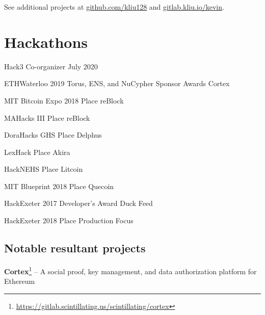 \documentclass[paper=letter]{tccv}
\begin{document}
See additional projects at \href{https://github.com/kliu128}{github.com/kliu128}
and \href{https://gitlab.kliu.io/kevin}{gitlab.kliu.io/kevin}.
    

\section{Hackathons}

\begin{yearlist}
    \item{Hack3}
         {Co-organizer} {July 2020}

    \item{ETHWaterloo 2019}
        {Torus, ENS, and NuCypher Sponsor Awards} {Cortex}

    \item{MIT Bitcoin Expo 2018}
        { Place} {reBlock}

    \item{MAHacks III}
        { Place} {reBlock}

    \item{DoraHacks GHS}
        { Place} {Delphus}

    \item{LexHack}
        { Place} {Akira}

    \item{HackNEHS}
        { Place} {Litcoin}

    \item{MIT Blueprint 2018}
        { Place} {Quecoin}

    \item{HackExeter 2017}
        {Developer's Award} {Duck Feed}

    \item{HackExeter 2018}
        { Place} {Production Focus}
\end{yearlist}

\subsection{Notable resultant projects}

\textbf{Cortex}\footnote{\url{https://gitlab.scintillating.us/scintillating/cortex}}
-- A social proof, key management, and data authorization platform for Ethereum
\end{document}
